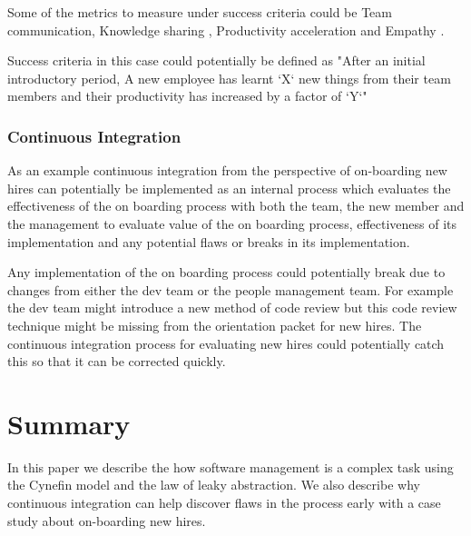 \documentclass[12pt,conference]{IEEEtran}
\begin{document}
Some of the metrics to measure under success criteria could be Team communication, Knowledge sharing \cite{cabrera_fostering_2005}, Productivity acceleration \cite{grote_making_2011} and Empathy \cite{seppala_hard_2014}.

Success criteria in this case could potentially be defined as "After an initial introductory period, A new employee has learnt `X` new things from their team members and their productivity has increased by a factor of `Y`"

\subsubsection*{Continuous Integration}
As an example continuous integration from the perspective of on-boarding new hires can potentially be implemented as an internal process which evaluates the effectiveness of the on boarding process with both the team, the new member and the management to evaluate value of the on boarding process, effectiveness of its implementation and any potential flaws or breaks in its implementation. 

Any implementation of the on boarding process could potentially break due to changes from either the dev team or the people management team. For example the dev team might introduce a new method of code review but this code review technique might be missing from the orientation packet for new hires. The continuous integration process for evaluating new hires could potentially catch this so that it can be corrected quickly.


\section*{Summary}

In this paper we describe the how software management is a complex task using the Cynefin model and the law of leaky abstraction. We also describe why continuous integration can help discover flaws in the process early with a case study about on-boarding new hires.



\end{document}
